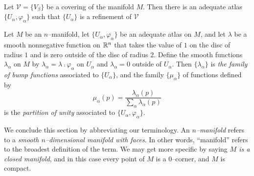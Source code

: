 \begin{theorem}
	Let $\mathcal{V}=\{V_\beta\}$ be a covering of the manifold $M$.
	Then there is an adequate atlas $\{U_\alpha,\varphi_\alpha\}$ such that $\{U_\alpha\}$ is a refinement of $\mathcal{V}$
\end{theorem}

\begin{defn}
	Let $M$ be an $n$--manifold, let $\{U_\alpha,\varphi_\alpha\}$ be an adequate atlas on $M$, and let $\lambda$ be a smooth nonnegative function on $\mathbb{R}^n$ that takes the value of $1$ on the disc of radius $1$ and is zero outside of the disc of radius $2$.
	Define the smooth functions $\lambda_\alpha$ on $M$ by $\lambda_\alpha=\lambda\comp\varphi_\alpha$ on $U_\alpha$ and $\lambda_\alpha=0$ outside of $U_\alpha$.
	Then $\{\lambda_\alpha\}$ is \emph{the family of bump functions} associated to $\{U_\alpha\}$, and the family $\{\mu_\alpha\}$ of functions defined by
	\[
		\mu_\alpha(p)=\frac{\lambda_\alpha(p)}{\sum_\alpha\lambda_\alpha(p)}
	\]
	is the \emph{partition of unity} associated to $\{U_\alpha,\varphi_\alpha\}$.
\end{defn}

We conclude this section by abbreviating our terminology.
An \emph{$n$--manifold} refers to a \emph{smooth $n$--dimensional manifold with faces}.
In other words, ``manifold'' refers to the broadest definition of the term.
We may get more specific by saying \emph{$M$ is a closed manifold}, and in this case every point of $M$ is a 0--corner, and $M$ is compact.


